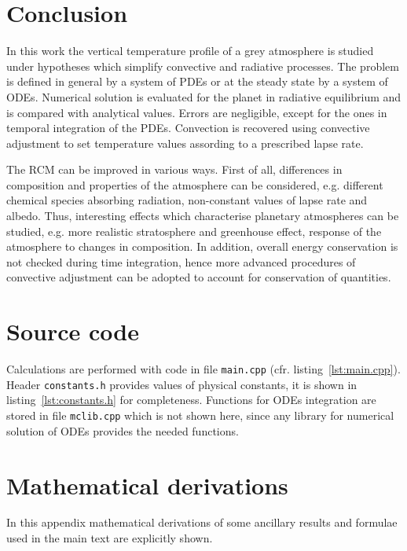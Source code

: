 \documentclass[a4paper,10pt,twocolumn,\classoptions]{article}
\begin{document}
\section{Conclusion}
In this work the vertical temperature profile of a grey atmosphere is studied under hypotheses which simplify convective and radiative processes. The problem is defined in general by a system of PDEs or at the steady state by a system of ODEs. Numerical solution is evaluated for the planet in radiative equilibrium and is compared with analytical values. Errors are negligible, except for the ones in temporal integration of the PDEs. Convection is recovered using convective adjustment to set temperature values assording to a prescribed lapse rate.

The RCM can be improved in various ways. First of all, differences in composition and properties of the atmosphere can be considered, e.g. different chemical species absorbing radiation, non-constant values of lapse rate and albedo. Thus, interesting effects which characterise planetary atmospheres can be studied, e.g. more realistic stratosphere and greenhouse effect, response of the atmosphere to changes in composition. In addition, overall energy conservation is not checked during time integration, hence more advanced procedures of convective adjustment can be adopted to account for conservation of quantities.



\newpage
\appendix

\section{Source code}
Calculations are performed with code in file \texttt{main.cpp} (cfr. listing~\ref{lst:main.cpp}). Header \texttt{constants.h} provides values of physical constants, it is shown in listing~\ref{lst:constants.h} for completeness. Functions for ODEs integration are stored in file \texttt{mclib.cpp} which is not shown here, since any library for numerical solution of ODEs provides the needed functions.
\onecolumn


\twocolumn



\section{Mathematical derivations}
In this appendix mathematical derivations of some ancillary results and formulae used in the main text are explicitly shown.
\end{document}
